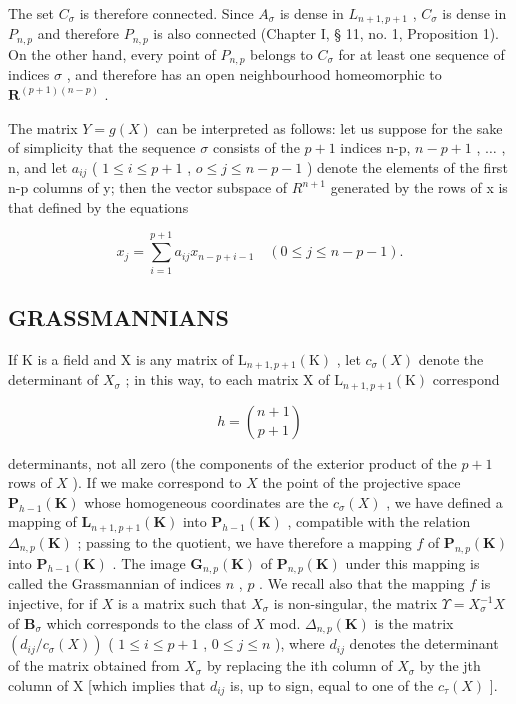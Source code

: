 The set \(C_{\sigma}\) is therefore connected. Since \(A_{\sigma}\) is dense in \(L_{n+1, p+1}\) , \(C_{\sigma}\) is dense in \(P_{n, p}\) and therefore \(P_{n, p}\) is also connected (Chapter I, § 11, no. 1, Proposition 1). On the other hand, every point of \(P_{n, p}\) belongs to \(C_{\sigma}\) for at least one sequence of indices \(\sigma\) , and therefore has an open neighbourhood homeomorphic to \(\mathbf{R}^{(p+1)(n-p)}\) .

The matrix \(Y=g(X)\) can be interpreted as follows: let us suppose for the sake of simplicity that the sequence \(\sigma\) consists of the \(p+1\) indices n-p, \(n-p+1\) , \(\ldots\) , n, and let \(a_{ij}\) ( \(1\leqslant i\leqslant p+1\) , \(o\leqslant j\leqslant n-p-1\) ) denote the elements of the first n-p columns of y; then the vector subspace of \(R^{n+1}\) generated by the rows of x is that defined by the equations

\[
x _ {j} = \sum_ {i = 1} ^ {p + 1} a _ {i j} x _ {n - p + i - 1} \quad (0 \leqslant j \leqslant n - p - 1).
\]

\subsection{GRASSMANNIANS}

If K is a field and X is any matrix of \(\mathrm{L}_{n+1,p+1}(\mathrm{K})\) , let \(c_{\sigma}(X)\) denote the determinant of \(X_{\sigma}\) ; in this way, to each matrix X of \(\mathrm{L}_{n+1,p+1}(\mathrm{K})\) correspond

\[
h = \binom {n + 1} {p + 1}
\]

determinants, not all zero (the components of the exterior product of the \(p + 1\) rows of \(X\) ). If we make correspond to \(X\) the point of the projective space \(\mathbf{P}_{h-1}(\mathbf{K})\) whose homogeneous coordinates are the \(c_{\sigma}(X)\) , we have defined a mapping of \(\mathbf{L}_{n+1,p+1}(\mathbf{K})\) into \(\mathbf{P}_{h-1}(\mathbf{K})\) , compatible with the relation \(\Delta_{n,p}(\mathbf{K})\) ; passing to the quotient, we have therefore a mapping \(f\) of \(\mathbf{P}_{n,p}(\mathbf{K})\) into \(\mathbf{P}_{h-1}(\mathbf{K})\) . The image \(\mathbf{G}_{n,p}(\mathbf{K})\) of \(\mathbf{P}_{n,p}(\mathbf{K})\) under this mapping is called the Grassmannian of indices \(n\) , \(p\) . We recall also that the mapping \(f\) is injective, for if \(X\) is a matrix such that \(X_{\sigma}\) is non-singular, the matrix \(\Upsilon = X_{\sigma}^{-1}X\) of \(\mathbf{B}_{\sigma}\) which corresponds to the class of \(X\) mod. \(\Delta_{n,p}(\mathbf{K})\) is the matrix \((d_{ij}/c_{\sigma}(X))\) ( \(1 \leqslant i \leqslant p + 1\) , \(0 \leqslant j \leqslant n\) ), where \(d_{ij}\) denotes the determinant of the matrix obtained from \(X_{\sigma}\) by replacing the ith column of \(X_{\sigma}\) by the jth column of X {[}which implies that \(d_{ij}\) is, up to sign, equal to one of the \(c_{\tau}(X)\) {]}.

